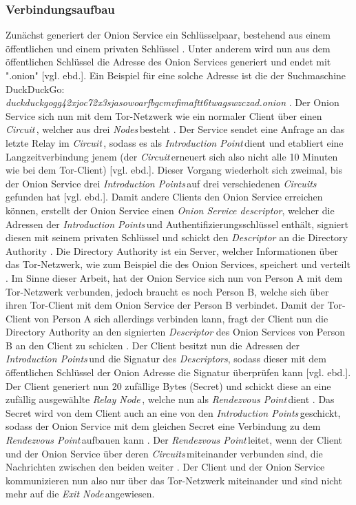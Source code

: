 \documentclass[a4paper,ngerman, headheight=28pt,12pt]{scrartcl}
\newcommand{\vcite}[1]{\cite[vgl.][]{#1}}
\newcommand{\vebd}{[vgl. ebd.]}
\newcommand{\relayn}{\textit{Relay Node\,}}
\newcommand{\exitn}{\textit{Exit Node\,}}
\newcommand{\nodes}{\textit{Nodes\,}}
\newcommand{\circuit}{\textit{Circuit\,}}
\newcommand{\circuits}{\textit{Circuits\,}}
\newcommand{\introp}{\textit{Introduction Point\,}}
\newcommand{\introps}{\textit{Introduction Points\,}}
\newcommand{\renp}{\textit{Rendezvous Point\,}}
\begin{document}

\subsubsection{Verbindungsaufbau}
Zunächst generiert der Onion Service ein Schlüsselpaar, bestehend aus einem öffentlichen und einem privaten Schlüssel \vcite{GeeksOnionService}. Unter anderem wird nun aus dem öffentlichen Schlüssel die Adresse des Onion Services generiert und endet mit ".onion" \vebd. Ein Beispiel für eine solche Adresse ist die der Suchmaschine DuckDuckGo: \\
\textit{duckduckgogg42xjoc72x3sjasowoarfbgcmvfimaftt6twagswzczad.onion} \vcite{DuckDuckGoLink}.
Der Onion Service sich nun mit dem Tor-Netzwerk wie ein normaler Client über einen \circuit, welcher aus drei \nodes besteht \vcite{TorOnionService}. Der Service sendet eine Anfrage an das letzte Relay im \circuit, sodass es als \introp dient und etabliert eine Langzeitverbindung jenem (der \circuit erneuert sich also nicht alle 10 Minuten wie bei dem Tor-Client) \vebd. Dieser Vorgang wiederholt sich zweimal, bis der Onion Service drei \introps auf drei verschiedenen \circuits gefunden hat \vebd. Damit andere Clients den Onion Service erreichen können, erstellt der Onion Service einen \textit{Onion Service descriptor}, welcher die Adressen der \introps und Authentifizierungsschlüssel enthält, signiert diesen mit seinem privaten Schlüssel und schickt den \textit{Descriptor} an die Directory Authority \vcite{TorSpecDerivingKeys, TorSpecDirectoryInf}. Die Directory Authority ist ein Server, welcher Informationen über das Tor-Netzwerk, wie zum Beispiel die des Onion Services, speichert und verteilt \vcite{TorDirectoryAuthority}. Im Sinne dieser Arbeit, hat der Onion Service sich nun von Person A mit dem Tor-Netzwerk verbunden, jedoch braucht es noch Person B, welche sich über ihren Tor-Client mit dem Onion Service der Person B verbindet. Damit der Tor-Client von Person A sich allerdings verbinden kann, fragt der Client nun die Directory Authority an den signierten \textit{Descriptor} des Onion Services von Person B an den Client zu schicken \vcite{TorStructure}. Der Client besitzt nun die Adressen der \introps und die Signatur des \textit{Descriptors}, sodass dieser mit dem öffentlichen Schlüssel der Onion Adresse die Signatur überprüfen kann \vebd. Der Client generiert nun 20 zufällige Bytes (Secret) und schickt diese an eine zufällig ausgewählte \relayn, welche nun als \renp dient \vcite{TorSpecRendezvous}. Das Secret wird von dem Client auch an eine von den \introps geschickt, sodass der Onion Service mit dem gleichen Secret eine Verbindung zu dem \renp aufbauen kann \vcite{TorSpecIntroP}. Der \renp leitet, wenn der Client und der Onion Service über deren \circuits miteinander verbunden sind, die Nachrichten zwischen den beiden weiter \vcite{TorSpecRendezvous}. Der Client und der Onion Service kommunizieren nun also nur über das Tor-Netzwerk miteinander und sind nicht mehr auf die \exitn angewiesen.
\end{document}
